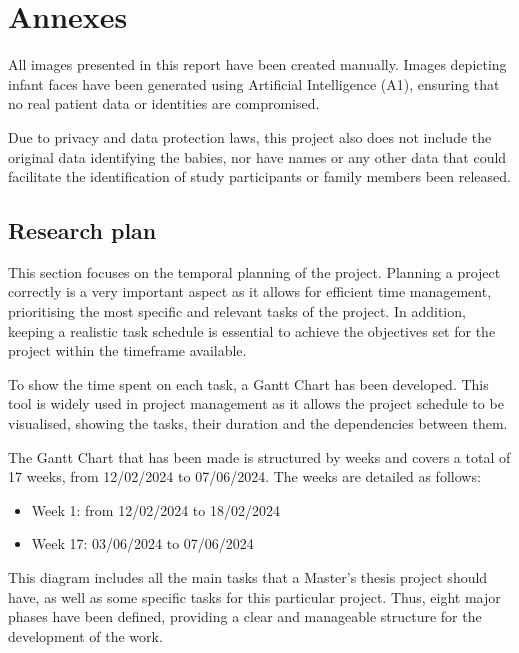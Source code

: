 %
\chapter{Annexes}
\label{ch::Annexes}

\begin{tcolorbox}
All images presented in this report have been created manually. Images depicting infant faces have been generated using Artificial Intelligence (A1), ensuring that no real patient data or identities are compromised.
\end{tcolorbox}
\vspace{2\baselineskip}
\begin{tcolorbox}
Due to privacy and data protection laws, this project also does not include the original data identifying the babies, nor have names or any other data that could facilitate the identification of study participants or family members been released.
\end{tcolorbox}


\newpage
\section*{Research plan}

This section focuses on the temporal planning of the project. Planning a project correctly is a very important aspect as it allows for efficient time management, prioritising the most specific and relevant tasks of the project. In addition, keeping a realistic task schedule is essential to achieve the objectives set for the project within the timeframe available.

To show the time spent on each task, a Gantt Chart has been developed. This tool is widely used in project management as it allows the project schedule to be visualised, showing the tasks, their duration and the dependencies between them.

The Gantt Chart that has been made is structured by weeks and covers a total of 17 weeks, from 12/02/2024 to 07/06/2024. The weeks are detailed as follows:
\begin{itemize}
    \item Week 1: from 12/02/2024 to 18/02/2024
    \item Week 17: 03/06/2024 to 07/06/2024
\end{itemize}

This diagram includes all the main tasks that a Master's thesis project should have, as well as some specific tasks for this particular project. Thus, eight major phases have been defined, providing a clear and manageable structure for the development of the work.


